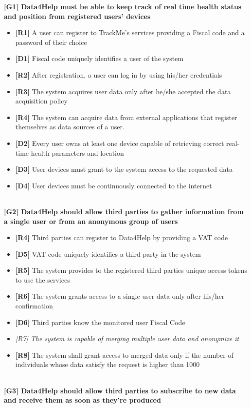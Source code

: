 \textbf{[G1] Data4Help must be able to keep track of real time health status and position from registered users' devices}
\begin{itemize}
	\item \textbf{[R1]} A user can register to TrackMe's services providing a Fiscal code and a password of their choice
	\item \textbf{[D1]} Fiscal code uniquely identifies a user of the system
	\item \textbf{[R2]} After registration, a user can log in by using his/her credentials
	\item \textbf{[R3]} The system acquires user data only after he/she accepted the data acquisition policy
	\item \textbf{[R4]} The system can acquire data from external applications that register themselves as data sources of a user.
	\item \textbf{[D2]} Every user owns at least one device capable of retrieving correct real-time health parameters and location
	\item \textbf{[D3]} User devices must grant to the system access to the requested data
	\item \textbf{[D4]} User devices must be continuously connected to the internet
\end{itemize}
\\
\textbf{[G2] Data4Help should allow third parties to gather information from a single user or from an anonymous group of users}
\begin{itemize}
	\item \textbf{[R4]} Third parties can register to Data4Help by providing a VAT code
	\item \textbf{[D5]} VAT code uniquely identifies a third party in the system
	\item \textbf{[R5]} The system provides to the registered third parties unique access tokens to use the services
	\item \textbf{[R6]} The system grants access to a single user data only after his/her confirmation
	\item \textbf{[D6]} Third parties know the monitored user Fiscal Code
	\item \textit{[R7] The system is capable of merging multiple user data and anonymize it}
	\item \textbf{[R8]} The system shall grant access to merged data only if the number	of individuals	whose data satisfy the request is higher than	 1000
\end{itemize}
\\
\textbf{[G3] Data4Help should allow third parties to subscribe to new data and receive them as soon as they're produced}

